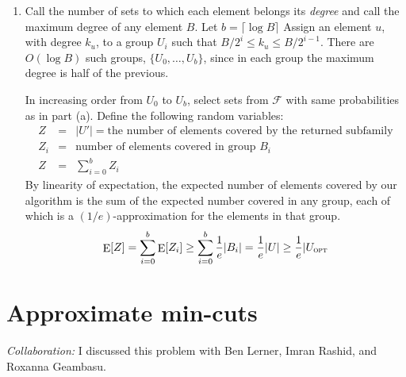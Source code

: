 \documentclass[12pt]{article}
\def\Exp#1{\mathop{\rm {E}}[#1]}
\begin{document}
\begin{enumerate}
\pagebreak

\item %
Call the number of sets to which each element belongs its \textit{degree}
and call the maximum degree of any element $B$. Let
$b = \lceil\log B \rceil$
Assign an element $u$, with degree $k_u$, to a group $U_i$ such that
$B/2^i \le k_u \le B/2^{i-1}$.
There are $O(\log B)$ such groups, $\{U_0,\ldots,U_{b}\}$,
since in each group the maximum degree is half of the previous.

In increasing order from $U_0$ to $U_{b}$,
select sets from $\mathcal{F}$ with same probabilities as in part (a).
Define the following random variables:
%
\begin{eqnarray*}
Z & = & |U'| = \textrm{the number of elements covered by the returned subfamily}\\
Z_i & = & \textrm{number of elements covered in group $B_i$}\\
Z & = & \sum_{i = 0}^b Z_i
\end{eqnarray*}
%
By linearity of expectation, the expected number of elements covered by our
algorithm is the sum of the expected number covered in any group, each of which
is a $(1/e)$-approximation for the elements in that group.
%
\begin{displaymath}
\Exp{Z} = \sum_{i = 0}^b \Exp{Z_i} \ge \sum_{i = 0}^b \frac{1}{e}|B_i| = \frac{1}{e}|U| \ge \frac{1}{e}|U_{\textsc{opt}}
\end{displaymath}

\end{enumerate}

\pagebreak

\section{Approximate min-cuts}

\textit{Collaboration:} I discussed this problem with Ben Lerner,
Imran Rashid, and Roxanna Geambasu.
\end{document}
